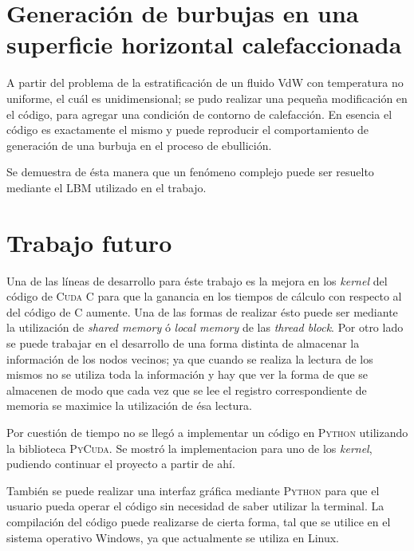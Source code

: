 \newpage

\section{Generación de burbujas en una superficie horizontal calefaccionada}

A partir del problema de la estratificación de un fluido VdW con temperatura no uniforme, el cuál es unidimensional; se pudo realizar una pequeña modificación en el código, para agregar una condición de contorno de calefacción. En esencia el código es exactamente el mismo y puede reproducir el comportamiento de generación de una burbuja en el proceso de ebullición. 

Se demuestra de ésta manera que un fenómeno complejo puede ser resuelto mediante el LBM utilizado en el trabajo.

\section{Trabajo futuro}

Una de las líneas de desarrollo para éste trabajo es la mejora en los \textit{kernel} del código de \textsc{Cuda C} para que la ganancia en los tiempos de cálculo con respecto al del código de \textsc{C} aumente. Una de las formas de realizar ésto puede ser mediante la utilización de \textit{shared memory} ó \textit{local memory} de las \textit{thread block}. Por otro lado se puede trabajar en el desarrollo de una forma distinta de almacenar la información de los nodos vecinos; ya que cuando se realiza la lectura de los mismos no se utiliza toda la información y hay que ver la forma de que se almacenen de modo que cada vez que se lee el registro correspondiente de memoria se maximice la utilización de ésa lectura.


Por cuestión de tiempo no se llegó a implementar un código en \textsc{Python} utilizando la biblioteca \textsc{PyCuda}. Se mostró la implementacion para uno de los \textit{kernel}, pudiendo continuar el proyecto a partir de ahí. 

También se puede realizar una interfaz gráfica mediante \textsc{Python} para que el usuario pueda operar el código sin necesidad de saber utilizar la terminal. La compilación del código puede realizarse de cierta forma, tal que se utilice en el sistema operativo Windows, ya que actualmente se utiliza en Linux. 